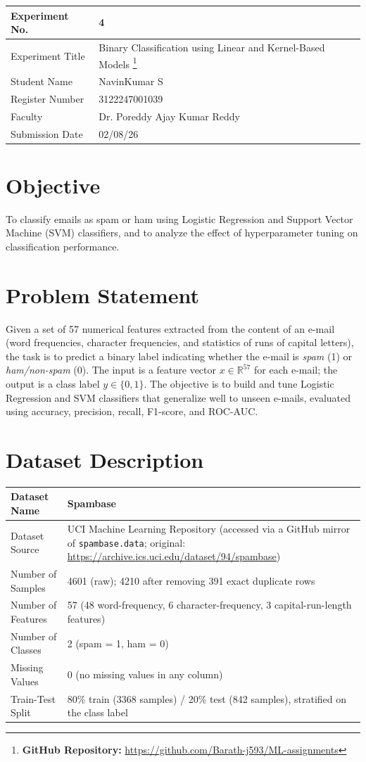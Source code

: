 \documentclass[12pt,a4paper]{article}
\begin{document}
\begin{tabular}{|p{4cm}|p{11cm}|}
\hline
Experiment No. & 4 \\ \hline
Experiment Title & Binary Classification using Linear and Kernel-Based Models
\footnote{\textbf{GitHub Repository: }\url{https://github.com/Barath-j593/ML-assignments}}\\ \hline
Student Name & NavinKumar S \\ \hline
Register Number & 3122247001039\\ \hline
Faculty & Dr. Poreddy Ajay Kumar Reddy \\ \hline
Submission Date & 02/08/26\\ \hline
\end{tabular}

\section{Objective}
To classify emails as spam or ham using Logistic Regression and Support Vector Machine (SVM) classifiers, and to analyze the effect of hyperparameter tuning on classification performance.

\section{Problem Statement}
Given a set of 57 numerical features extracted from the content of an e-mail (word frequencies, character frequencies, and statistics of runs of capital letters), the task is to predict a binary label indicating whether the e-mail is \emph{spam} (1) or \emph{ham/non-spam} (0). The input is a feature vector $x \in \mathbb{R}^{57}$ for each e-mail; the output is a class label $y \in \{0,1\}$. The objective is to build and tune Logistic Regression and SVM classifiers that generalize well to unseen e-mails, evaluated using accuracy, precision, recall, F1-score, and ROC-AUC.

\section{Dataset Description}
\begin{longtable}{|p{6cm}|p{8cm}|}
\hline
Dataset Name & Spambase \\ \hline
Dataset Source & UCI Machine Learning Repository (accessed via a GitHub mirror of \texttt{spambase.data}; original: \url{https://archive.ics.uci.edu/dataset/94/spambase}) \\ \hline
Number of Samples & 4601 (raw); 4210 after removing 391 exact duplicate rows \\ \hline
Number of Features & 57 (48 word-frequency, 6 character-frequency, 3 capital-run-length features) \\ \hline
Number of Classes & 2 (spam = 1, ham = 0) \\ \hline
Missing Values & 0 (no missing values in any column) \\ \hline
Train-Test Split & 80\% train (3368 samples) / 20\% test (842 samples), stratified on the class label \\ \hline
\end{longtable}
\end{document}
